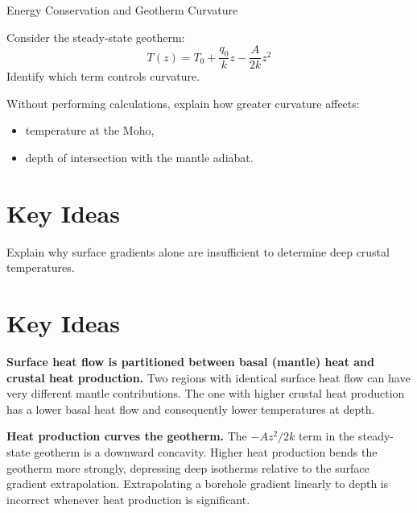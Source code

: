 \begin{activity}{Energy Conservation and Geotherm Curvature}
\begin{questions}
  \item Consider the steady-state geotherm:
  \[
    T(z) = T_0 + \frac{q_0}{k}z - \frac{A}{2k}z^2
  \]
  Identify which term controls curvature.
  \answerbox[2cm]

  \item Without performing calculations, explain how greater curvature affects:
  \begin{itemize}
    \item temperature at the Moho,
    \item depth of intersection with the mantle adiabat.
  \end{itemize}
  \answerbox[4cm]
\end{questions}

\section*{Key Ideas}
Explain why surface gradients alone are insufficient to determine deep crustal
temperatures.

\answerbox[3cm]

{\color{red}
\section*{Key Ideas}

\textbf{Surface heat flow is partitioned between basal (mantle) heat and crustal heat production.} Two regions with identical surface heat flow can have very different mantle contributions. The one with higher crustal heat production has a lower basal heat flow and consequently lower temperatures at depth.

{\color{blue}
\textbf{Heat production curves the geotherm.} The $-Az^2/2k$ term in the steady-state geotherm is a downward concavity. Higher heat production bends the geotherm more strongly, depressing deep isotherms relative to the surface gradient extrapolation. Extrapolating a borehole gradient linearly to depth is incorrect whenever heat production is significant.

\begin{figure}[h]
\centering
{}
\end{figure}}}
\end{activity}
